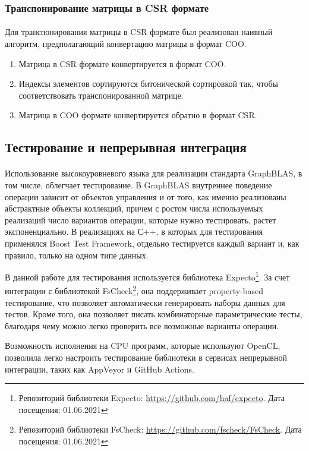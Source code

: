 \subsubsection{Транспонирование матрицы в CSR формате}
\paragraph{}
Для транспонирования матрицы в CSR формате был реализован наивный алгоритм, предполагающий конвертацию матрицы в формат COO.
\begin{enumerate}
    \item Матрица в CSR формате конвертируется в формат COO.
    \item Индексы элементов сортируются битонической сортировкой так, чтобы соответствовать транспонированной матрице.
    \item Матрица в COO формате конвертируется обратно в формат CSR.
\end{enumerate}

\subsection{Тестирование и непрерывная интеграция}
\paragraph{}
Использование высокоуровневого языка для реализации стандарта GraphBLAS, в том числе, облегчает тестирование. В GraphBLAS внутреннее поведение операции зависит от объектов управления и от того, как именно реализованы абстрактные объекты коллекций, причем с ростом числа используемых реализаций число вариантов операции, которые нужно тестировать, растет экспоненциально. В реализациях на С++, в которых для тестирования применялся Boost Test Framework, отдельно тестируется каждый вариант и, как правило, только на одном типе данных. 

В данной работе для тестирования используется библиотека Expecto\footnote{Репозиторий библиотеки Expecto: \url{https://github.com/haf/expecto}. Дата посещения: 01.06.2021}. За счет интеграции с библиотекой FsCheck\footnote{Репозиторий библиотеки FsCheck: \url{https://github.com/fscheck/FsCheck}. Дата посещения: 01.06.2021}, она поддерживает property-based тестирование, что позволяет автоматически генерировать наборы данных для тестов. Кроме того, она позволяет писать комбинаторные параметрические тесты, благодаря чему можно легко проверить все возможные варианты операции.

Возможность исполнения на CPU программ, которые используют OpenCL, позволила легко настроить тестирование библиотеки в сервисах непрерывной интеграции, таких как AppVeyor и GitHub Actions. 
